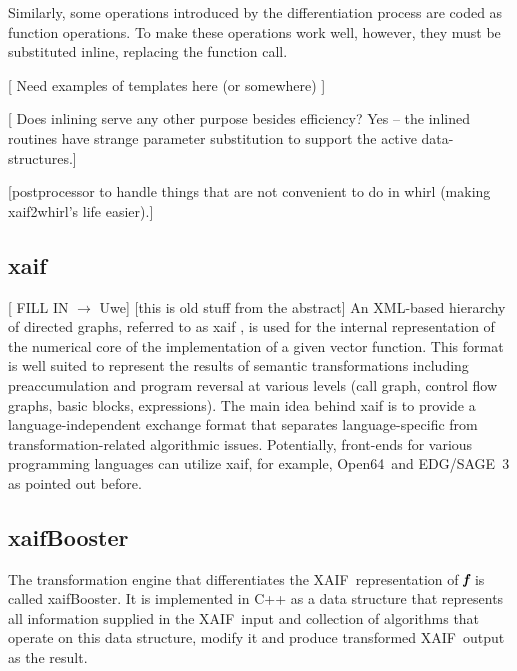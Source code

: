 \documentclass[11pt]{article}
\newcommand{\OpenSixtyFour}{Open64}
\newcommand{\xaif}{XAIF}
\newcommand{\xaifBooster}{xaifBooster}
\newcommand{\bmf}{\mbox{\bf\em f}}
\begin{document}
Similarly, some operations introduced by the differentiation process
are coded as function operations. To make these operations work well,
however, they must be substituted inline, replacing the function call.

{\color{red}
[ Need examples of templates here (or somewhere) ]

[ Does inlining serve any other purpose besides efficiency?  Yes --
the inlined routines have strange parameter substitution to support
the active data-structures.]

[postprocessor to handle things that are not convenient to do in whirl
(making xaif2whirl's life easier).]
}

\subsection{xaif} \label{ssec:xaif}
{\color{red} [ FILL IN $\to$ Uwe] } 
{\color{blue} [this is old stuff from the abstract] 
An XML-based \cite{xmlWeb} hierarchy of directed graphs, referred to as xaif 
\cite{HNN02}, is used for the 
internal representation of the numerical core of the implementation
of a given vector function. This format is 
well suited to represent the results of  semantic transformations including 
preaccumulation \cite{BiHa96,CDB96,GrRe91} and 
program reversal \cite{Gri92,WaGr01} at various levels (call graph, control 
flow graphs, basic blocks, expressions). 
The main idea behind xaif is to provide a language-independent exchange
format that separates language-specific from transformation-related 
algorithmic issues. Potentially, front-ends for various programming languages 
can utilize xaif, for example, \OpenSixtyFour\ and EDG/SAGE~3 as pointed out before.
}
\subsection{\xaifBooster} 
The transformation engine that differentiates the \xaif\ representation of 
$\bmf$ is called \xaifBooster. It is implemented in C++ as a 
data structure that represents all information supplied in the \xaif\ input 
and collection of algorithms that operate on this data structure, modify 
it and produce transformed  \xaif\ output as the result. 
\end{document}
